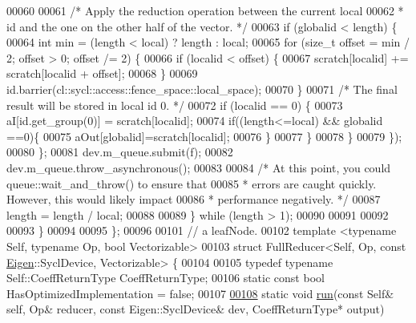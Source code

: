 \begin{DoxyCode}
00060 
00061                   \textcolor{comment}{/* Apply the reduction operation between the current local}
00062 \textcolor{comment}{                   * id and the one on the other half of the vector. */}
00063                   \textcolor{keywordflow}{if} (globalid < length) \{
00064                     \textcolor{keywordtype}{int} min = (length < local) ? length : local;
00065                     \textcolor{keywordflow}{for} (\textcolor{keywordtype}{size\_t} offset = min / 2; offset > 0; offset /= 2) \{
00066                       \textcolor{keywordflow}{if} (localid < offset) \{
00067                         scratch[localid] += scratch[localid + offset];
00068                       \}
00069                       \textcolor{keywordtype}{id}.barrier(cl::sycl::access::fence\_space::local\_space);
00070                     \}
00071                     \textcolor{comment}{/* The final result will be stored in local id 0. */}
00072                     \textcolor{keywordflow}{if} (localid == 0) \{
00073                       aI[\textcolor{keywordtype}{id}.get\_group(0)] = scratch[localid];
00074                       \textcolor{keywordflow}{if}((length<=local) && globalid ==0)\{
00075                         aOut[globalid]=scratch[localid];
00076                       \}
00077                     \}
00078                   \}
00079                 \});
00080           \};
00081             dev.m\_queue.submit(f);
00082             dev.m\_queue.throw\_asynchronous();
00083 
00084           \textcolor{comment}{/* At this point, you could queue::wait\_and\_throw() to ensure that}
00085 \textcolor{comment}{           * errors are caught quickly. However, this would likely impact}
00086 \textcolor{comment}{           * performance negatively. */}
00087           length = length / local;
00088 
00089         \} \textcolor{keywordflow}{while} (length > 1);
00090 
00091 
00092 
00093 \}
00094 
00095 \};
00096 
00101 \textcolor{comment}{// a leafNode.}
00102 \textcolor{keyword}{template} <\textcolor{keyword}{typename} Self, \textcolor{keyword}{typename} Op, \textcolor{keywordtype}{bool} Vectorizable>
00103 \textcolor{keyword}{struct }FullReducer<Self, Op, const \hyperlink{namespace_eigen}{Eigen}::SyclDevice, Vectorizable> \{
00104 
00105   \textcolor{keyword}{typedef} \textcolor{keyword}{typename} Self::CoeffReturnType CoeffReturnType;
00106   \textcolor{keyword}{static} \textcolor{keyword}{const} \textcolor{keywordtype}{bool} HasOptimizedImplementation = \textcolor{keyword}{false};
00107 
\hyperlink{struct_eigen_1_1internal_1_1_full_reducer_3_01_self_00_01_op_00_01const_01_eigen_1_1_sycl_device_00_01_vectorizable_01_4_aee608a1f9a8dca2b99477c2738357c05}{00108}   \textcolor{keyword}{static} \textcolor{keywordtype}{void} \hyperlink{struct_eigen_1_1internal_1_1_full_reducer_3_01_self_00_01_op_00_01const_01_eigen_1_1_sycl_device_00_01_vectorizable_01_4_aee608a1f9a8dca2b99477c2738357c05}{run}(\textcolor{keyword}{const} Self& \textcolor{keyword}{self}, Op& reducer, \textcolor{keyword}{const} Eigen::SyclDevice& dev, CoeffReturnType* output) 

\end{DoxyCode}
